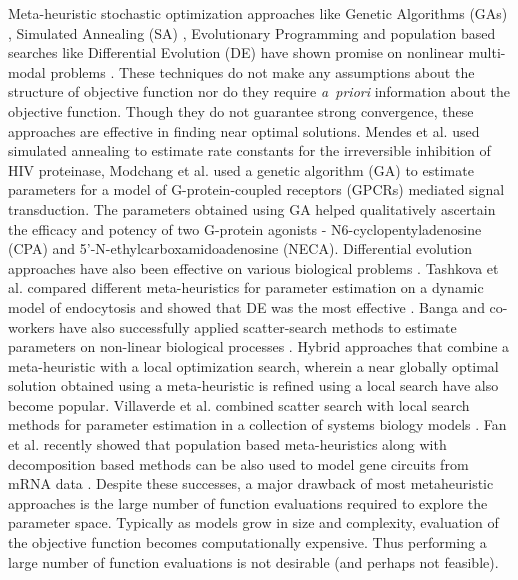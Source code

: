\documentclass[12pt]{article}
\begin{document}
Meta-heuristic stochastic optimization approaches like Genetic Algorithms (GAs) \cite{goldberg2006genetic}, Simulated Annealing (SA) \cite{kirkpatrick1983optimization},
Evolutionary Programming \cite{fogel2009artificial} and population based searches like Differential Evolution (DE) \cite{storn1997differential} have shown promise on nonlinear multi-modal problems \cite{sun2012parameter}.
These techniques do not make any assumptions about the structure of objective function nor do they require \textit{a~priori} information about the objective function.
Though they do not guarantee strong convergence, these approaches are effective in finding near optimal solutions.
Mendes et al. \cite{mendes1998non} used simulated annealing to estimate rate constants for the irreversible inhibition of HIV proteinase,
Modchang et al. \cite{modchang2008mathematical} used a genetic algorithm (GA) to estimate parameters for a model of G-protein-coupled receptors (GPCRs) mediated signal transduction. The parameters obtained using GA helped qualitatively ascertain the efficacy and potency of two G-protein agonists - N6-cyclopentyladenosine (CPA) and 5'-N-ethylcarboxamidoadenosine (NECA). 
Differential evolution approaches have also been effective on various biological problems \cite{tsai2005evolutionary,wang2001hybrid,noman2007inferring}.
Tashkova et al. compared different meta-heuristics for parameter estimation on a dynamic model of endocytosis and showed that DE was the most effective \cite{tashkova2011parameter}.
Banga and co-workers have also successfully applied scatter-search methods to estimate parameters on non-linear biological processes \cite{villaverde2012cooperative,rodriguez2006novel,egea2007scatter}.
Hybrid approaches that combine a meta-heuristic with a local optimization search, wherein a near globally optimal solution obtained using a meta-heuristic is refined using a local search have also become popular.
Villaverde et al. combined scatter search with local search methods for parameter estimation in a collection of systems biology models \cite{villaverde2015biopredyn}.
Fan et al. recently showed that population based meta-heuristics along with decomposition based methods can be also used to model gene circuits from mRNA data \cite{fan2015parameter}.
Despite these successes, a major drawback of most metaheuristic approaches is the large number of function evaluations required to explore the parameter space.
Typically as models grow in size and complexity, evaluation of the objective function becomes computationally expensive.
Thus performing a large number of function evaluations is not desirable (and perhaps not feasible).
\end{document}
